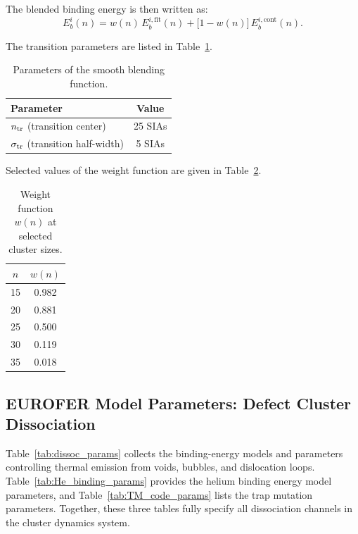 \documentclass[pdflatex,sn-basic]{sn-jnl} %
\begin{document}
The blended binding energy is then written as:
\begin{equation}
E_b^i(n)
=
w(n)\,E_b^{i,\mathrm{fit}}(n)
+
\bigl[1-w(n)\bigr]\,E_b^{i,\mathrm{cont}}(n).
\label{eq:Eb_blended}
\end{equation}

The transition parameters are listed in Table~\ref{tab:transition_params}.

\begin{table}[htbp]
\centering
\caption{Parameters of the smooth blending function.}
\label{tab:transition_params}
\begin{tabular}{lc}
\hline\hline
Parameter & Value \\
\hline
\(n_{\rm tr}\) (transition center)     & 25 SIAs \\
\(\sigma_{\rm tr}\) (transition half-width) & 5 SIAs \\
\hline\hline
\end{tabular}
\end{table}

Selected values of the weight function are given in
Table~\ref{tab:weight_values}.

\begin{table}[htbp]
\centering
\caption{Weight function \(w(n)\) at selected cluster sizes.}
\label{tab:weight_values}
\begin{tabular}{cc}
\hline\hline
\(n\) & \(w(n)\) \\
\hline
15 & 0.982 \\
20 & 0.881 \\
25 & 0.500 \\
30 & 0.119 \\
35 & 0.018 \\
\hline\hline
\end{tabular}
\end{table}
\subsection{EUROFER Model Parameters: Defect Cluster Dissociation}
\label{sec:params_dissociation}

Table~\ref{tab:dissoc_params} collects the binding-energy models and
parameters controlling thermal emission from voids, bubbles, and dislocation
loops. Table~\ref{tab:He_binding_params} provides the helium binding energy
model parameters, and Table~\ref{tab:TM_code_params} lists the trap mutation
parameters. Together, these three tables fully specify all dissociation
channels in the cluster dynamics system.
\end{document}
